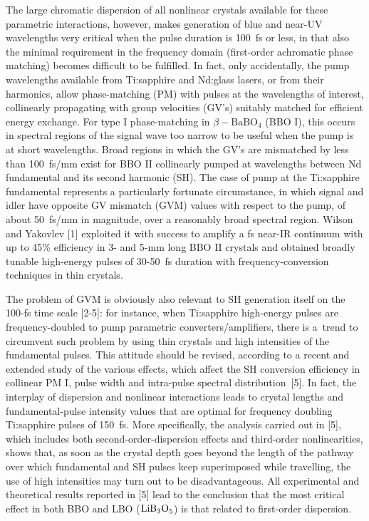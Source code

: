 \documentclass[times]{jtitauth}
\begin{document}
The large chromatic dispersion of all nonlinear crystals available
for these parametric interactions, however, makes generation of
blue and near-UV wavelengths very critical when the pulse duration
is 100~fs or less, in that also the minimal requirement in the
frequency domain (first-order achromatic phase matching) becomes
difficult to be fulfilled. In fact, only accidentally, the pump
wavelengths available from Ti:sapphire and Nd:glass lasers, or
from their harmonics, allow phase-matching (PM) with pulses at the
wavelengths of interest, collinearly propagating with group
velocities (GV's) sui\-tably matched for efficient energy
exchange. For type I phase-matching in $\beta-\textrm{BaBO}_4$
(BBO I), this occurs in spectral regions of the signal wave too
narrow to be useful when the pump is at short wavelengths. Broad
regions in which the GV's are mismatched by less than 100~fs/mm
exist for BBO II collinearly pumped at wavelengths between Nd
fundamental and its second harmonic (SH). The case of pump at the
Ti:sapphire fundamental represents a particularly fortunate
circumstance, in which signal and idler have opposite GV mismatch
(GVM) values with respect to the pump, of about 50~fs/mm in
magnitude, over a reasonably broad spectral region. Wilson and
Yakovlev [1] exploited it with success to amplify a fs near-IR
continuum with up to 45\% efficiency in 3- and 5-mm long BBO II
crystals and obtained broadly tunable high-energy pulses of
30-50~fs duration with frequency-conversion techniques in thin
crystals.

The problem of GVM is obviously also relevant to SH generation
itself on the 100-fs time scale [2-5]: for instance, when
Ti:sapphire high-energy pulses are frequency-doubled to pump
parametric converters/amplifiers, there is a~trend to circumvent
such problem by using thin crystals and high intensities of the
fundamental pulses. This attitude should be revised, according to
a recent and extended study of the various effects, which affect
the SH conversion efficiency in collinear PM I, pulse width and
intra-pulse spectral distribution~[5]. In fact, the interplay of
dispersion and nonlinear interactions leads to crystal lengths and
fundamental-pulse intensity values that are optimal for frequency
doubling Ti:sapphire pulses of 150~fs. More specifically, the
ana\-lysis carried out in  [5], which includes both
second-order-dispersion effects and third-order nonlinearities,
shows that, as soon as the crystal depth goes beyond the length of
the pathway over which fundamental and SH pulses keep superimposed
while travelling, the use of high intensities may turn out to be
disadvantageous. All experimental and theoretical results reported
in  [5] lead to the conclusion that the most critical effect in
both BBO and LBO (${\rm LiB_3O}_5$) is that related to first-order
dispersion.
\end{document}
